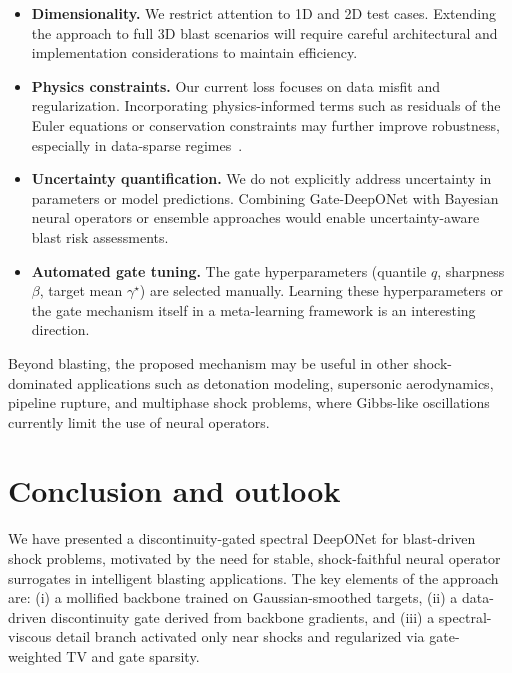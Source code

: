 \documentclass[a4paper,fleqn]{cas-dc}
\begin{document}
\begin{itemize}[leftmargin=*]
  \item \textbf{Dimensionality.}
    We restrict attention to 1D and 2D test cases.
    Extending the approach to full 3D blast scenarios will require careful architectural and implementation considerations to maintain efficiency.
  \item \textbf{Physics constraints.}
    Our current loss focuses on data misfit and regularization.
    Incorporating physics-informed terms such as residuals of the Euler equations or conservation constraints may further improve robustness, especially in data-sparse regimes~\citep{Raissi2019PINN,Karniadakis2021MachineLearningPDE}.
  \item \textbf{Uncertainty quantification.}
    We do not explicitly address uncertainty in parameters or model predictions.
    Combining Gate-DeepONet with Bayesian neural operators or ensemble approaches would enable uncertainty-aware blast risk assessments.
  \item \textbf{Automated gate tuning.}
    The gate hyperparameters (quantile $q$, sharpness $\beta$, target mean $\gamma^\star$) are selected manually.
    Learning these hyperparameters or the gate mechanism itself in a meta-learning framework is an interesting direction.
\end{itemize}

Beyond blasting, the proposed mechanism may be useful in other shock-dominated applications such as detonation modeling, supersonic aerodynamics, pipeline rupture, and multiphase shock problems, where Gibbs-like oscillations currently limit the use of neural operators.

\section{Conclusion and outlook}
\label{sec:conclusion}

We have presented a discontinuity-gated spectral DeepONet for blast-driven shock problems, motivated by the need for stable, shock-faithful neural operator surrogates in intelligent blasting applications.
The key elements of the approach are:
(i) a mollified backbone trained on Gaussian-smoothed targets,
(ii) a data-driven discontinuity gate derived from backbone gradients, and
(iii) a spectral-viscous detail branch activated only near shocks and regularized via gate-weighted TV and gate sparsity.
\end{document}
